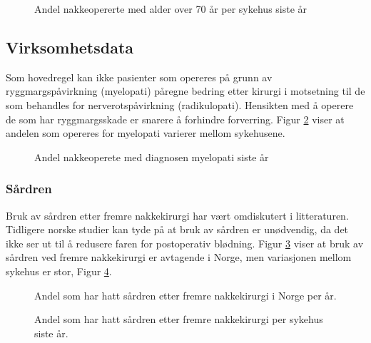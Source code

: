 \begin{figure}[ht]
\caption{\label{fig:NakkeAlder70Sh} Andel nakkeopererte med alder over 70 år per sykehus siste år}
\end{figure}

\clearpage

\subsection{Virksomhetsdata}

Som hovedregel kan ikke pasienter som opereres på grunn av ryggmargspåvirkning (myelopati) påregne bedring etter kirurgi i motsetning til de som behandles for nerverotspåvirkning (radikulopati). Hensikten med å operere de som har ryggmargsskade er snarere å forhindre forverring. Figur \ref{fig:NakkeOprIndikMyelopatiSh} viser at andelen som opereres for myelopati varierer mellom sykehusene.

\begin{figure}[ht]
\caption{\label{fig:NakkeOprIndikMyelopatiSh} Andel nakkeoperete med diagnosen myelopati siste år}
\end{figure}




\clearpage

\subsubsection{Sårdren}

Bruk av sårdren etter fremre nakkekirurgi har vært omdiskutert i litteraturen. Tidligere norske studier kan tyde på at bruk av sårdren er unødvendig, da det ikke ser ut til å redusere faren for postoperativ blødning. Figur \ref{fig:NakkeSaardrenUmFTid} viser at bruk av sårdren ved fremre nakkekirurgi er avtagende i Norge, men variasjonen mellom sykehus er stor, Figur \ref{fig:NakkeSaardrenUmFSh}.

\begin{figure}[ht]
\caption{\label{fig:NakkeSaardrenUmFTid} Andel som har hatt sårdren etter fremre nakkekirurgi i Norge per år.}
\end{figure}

\begin{figure}[ht]
\caption{\label{fig:NakkeSaardrenUmFSh} Andel som har hatt sårdren etter fremre nakkekirurgi per sykehus siste år.}
\end{figure}

